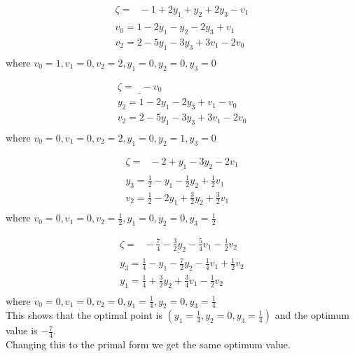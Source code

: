 \documentclass[11.5pt, letterpaper, bibtotoc,
    tablecaptionabove, figurecaptionabove]{article}
\begin{document}
\begin{align*}
	\underline{\zeta = \:\:\: -1 +2y_1 +y_2 +2y_3 -v_1}\\
	v_0 = 1 -2y_1 -y_2 -2y_3 +v_1\\
	v_2 = 2 -5y_1 -3y_3 +3v_1 -2v_0\\
\end{align*}
where $v_0 = 1, v_1 = 0, v_2= 2, y_1=0, y_2=0, y_3=0$ 
 
 \begin{align*}
	\underline{\zeta = \:\:\: -v_0}\\
	y_2 = 1 -2y_1 -2y_3 +v_1 - v_0\\
	v_2 = 2 - 5y_1 -3y_3 + 3v_1 - 2v_0\\
\end{align*}
where $v_0 = 0, v_1 = 0, v_2= 2, y_1=0, y_2=1, y_3=0$ 

 \begin{align*}
	\underline{\zeta = \:\:\: -2 + y_1 -3y_2 - 2v_1}\\
	y_3 = \frac{1}{2} - y_1 - \frac{1}{2}y_2 + \frac{1}{2}v_1\\
	v_2 = \frac{1}{2} - 2y_1 + \frac{3}{2}y_2 + \frac{3}{2}v_1\\
\end{align*}
where $v_0 = 0, v_1 = 0, v_2= \frac{1}{2}, y_1=0, y_2=0, y_3=\frac{1}{2}$  

 \begin{align*}
	\underline{\zeta = \:\:\: -\frac{7}{4} - \frac{3}{2}y_2 - \frac{5}{4}v_1 - \frac{1}{2}v_2}\\
	y_3 = \frac{1}{4} - y_1 - \frac{7}{2}y_2 - \frac{1}{4}v_1 + \frac{1}{2}v_2\\
	y_1 = \frac{1}{4} + \frac{3}{2}y_2 + \frac{3}{4}v_1 - \frac{1}{2}v_2\\
\end{align*}
where $v_0 = 0, v_1 = 0, v_2= 0, y_1=\frac{1}{4}, y_2=0, y_3=\frac{1}{4}$  \\
This shows that the optimal point is $(y_1=\frac{1}{4}, y_2 = 0, y_3=\frac{1}{4})$ and the optimum value is $-\frac{7}{4}$. \\
Changing this to the primal form we get the same optimum value.
 
\end{document}
